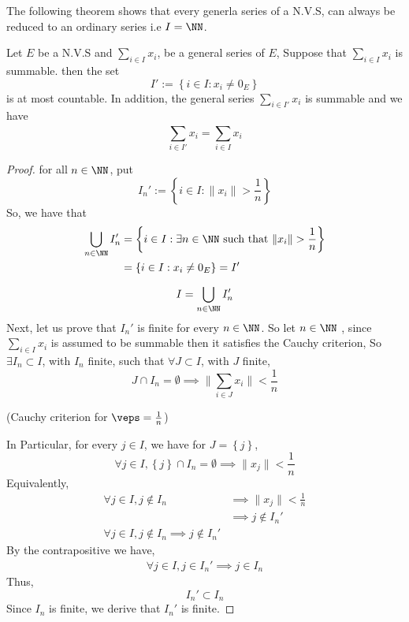 The following theorem shows that every generla series of 
a N.V.S, can always be reduced to an ordinary series i.e 
$I = \NN $.

\begin{theorem}[]
	Let $E $ be a N.V.S and 
	$\sum_{i \in  I}^{ } x_{i}$, be a general 
	series of $E $, Suppose that $\sum_{i \in  I}^{} 
	x_{i}$ is summable. then the set 
	\[
	I' := 
	\left\{ i \in  I: x_{i} \neq 0_{E} \right\}
	\]
	is at most countable. In addition, the general series $\sum_{
	i \in  I'}^{} x_{i} $ is summable and we have 
	\[
	\sum_{i \in   I'}^{} x_{i} = 
	\sum_{i  \in I}^{}  x_{i}
	\]
\end{theorem}
\begin{proof}
for all $n \in  \NN $, put 
\[
I_{n}' := 
\left\{ i \in  I: 
\| x_{i} \|  >  \frac{1}{n}\right\}
\]
So, we have that 
\begin{align*}
	\bigcup_{n \in  \NN}^{}  I_{n}' &=
	\left\{ i \in  I: \exists n \in  \NN 
	\text{ such that }  \| x_{i} \| > \frac{1}{n} \right\} \\
					&= 
					\left\{ i \in  I: 
				x_{i} \neq  0_{E}\right\} =
				I'
\end{align*}
\[
I = \bigcup_{n \in  \NN}^{} I_{n}'
\]
Next, let us prove that $I_{n}' $ is finite for every $n \in \NN $. 
So let $n \in \NN $ , since $\sum_{i \in  I}^{}  x_{i}$ 
is assumed to be summable then it satisfies the Cauchy criterion,
So $\exists  I_{n} \subset I $, with $I_{n} $ finite, such that 
$\forall J \subset I $, with $J$ finite, 
\[
J \cap I_{n} = \emptyset \implies 
\| \sum_{i \in  J}^{} x_{i} \|  
<  \frac{1}{n}
\]
\begin{center}
(Cauchy criterion for $\veps = \frac{1}{n} $) 
\end{center}
In Particular, for every $j \in  I $, we have 
for $J = \left\{ j \right\}$,
\[
\forall j \in  I, \left\{ j \right\} \cap I_{n} =\emptyset 
\implies \| x_{j} \|  <  \frac{1}{n}
\]
Equivalently, 
\begin{align*}
\forall j \in  I, 
j \notin I_{n} & \implies 
\| x_{j} \|  <  \frac{1}{n} \\
	       & \implies 
	       j \notin  I_{n}' \\
	    \forall  j \in  I, 
	    j \notin I_{n} \implies 
	    j \notin  I_{n} '
\end{align*}
By the contrapositive we have, 
\begin{align*}
	\forall  j \in  I, j \in I_{n}' \implies 
	j \in  I_{n}
\end{align*}
Thus, 
\[
I_{n}' \subset I_{n}
\]
Since $I_{n} $ is finite, we derive that 
$I_{n}' $ is finite.


\end{proof}
